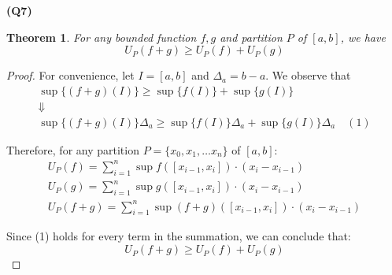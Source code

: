 \documentclass[12pt, a4paper]{article}
\newcommand{\usum}[2]{U_{#1}(#2)}
\newtheorem{theorem}{Theorem}
\begin{document}
\textbf{(Q7)}

\begin{theorem}
    For any bounded function $f, g$ and partition $P$ of $[a, b]$, we have
    \[\usum{P}{f + g} \geq \usum{P}{f} + \usum{P}{g}\]
\end{theorem}

\begin{proof}
    For convenience, let $I = [a, b]$ and $\Delta_a = b - a$. We observe that
    \begin{gather*}
        \sup\{(f + g)(I)\} \geq \sup\{f(I)\} + \sup\{g(I)\}\\
        \Downarrow\\
        \sup\{(f + g)(I)\}\Delta_a \geq \sup\{f(I)\}\Delta_a + \sup\{g(I)\}\Delta_a \quad (1)
    \end{gather*}

    Therefore, for any partition $P = \{x_0, x_1, \ldots x_n\}$ of $[a, b]$:
    \begin{gather*}
        \usum{P}{f} = \sum_{i = 1}^{n} \sup f([x_{i - 1}, x_i]) \cdot (x_i - x_{i - 1})\\
        \usum{P}{g} = \sum_{i = 1}^{n} \sup g([x_{i - 1}, x_i]) \cdot (x_i - x_{i - 1})\\
        \usum{P}{f + g} = \sum_{i = 1}^{n} \sup (f + g)([x_{i - 1}, x_i]) \cdot (x_i - x_{i - 1})
    \end{gather*}

    Since (1) holds for every term in the summation, we can conclude that:
    \[
        \usum{P}{f + g} \geq \usum{P}{f} + \usum{P}{g}
    \]
\end{proof}
\end{document}
